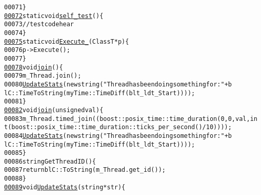 \begin{footnotesize}
\begin{alltt}
00071             \}
\hypertarget{myThreadTemplates_8hpp_source_l00072}{}\hyperlink{classbuskol_1_1ThreadTemplates_1_1thread__1_ac33a5aa33679452b203c539401c92929}{00072}             \textcolor{keyword}{static} \textcolor{keywordtype}{void} \hyperlink{classbuskol_1_1ThreadTemplates_1_1thread__1_ac33a5aa33679452b203c539401c92929}{self_test}()\{
00073                 \textcolor{comment}{//test code hear}
00074             \}
\hypertarget{myThreadTemplates_8hpp_source_l00075}{}\hyperlink{classbuskol_1_1ThreadTemplates_1_1thread__1_a37cde0d5c6105d9194ce1cf981cf9c5a}{00075}             \textcolor{keyword}{static} \textcolor{keywordtype}{void} \hyperlink{classbuskol_1_1ThreadTemplates_1_1thread__1_a37cde0d5c6105d9194ce1cf981cf9c5a}{Execute_}(ClassT *p)\{
00076                 p->Execute();
00077             \}
\hypertarget{myThreadTemplates_8hpp_source_l00078}{}\hyperlink{classbuskol_1_1ThreadTemplates_1_1thread__1_af917523b30feb06614e96371a5c198ed}{00078}             \textcolor{keywordtype}{void} \hyperlink{classbuskol_1_1ThreadTemplates_1_1thread__1_af917523b30feb06614e96371a5c198ed}{join}()\{
00079                 m\_Thread.join();
00080                 \hyperlink{classbuskol_1_1ThreadTemplates_1_1thread__1_ab97928f6c8b8c75b33ffd6e57514d692}{UpdateStats}(\textcolor{keyword}{new} \textcolor{keywordtype}{string}(\textcolor{stringliteral}{"Thread has been doing something for: "}+ b
      lC::TimeToString(myTime::TimeDiff(blt\_ldt\_Start))));
00081             \}
\hypertarget{myThreadTemplates_8hpp_source_l00082}{}\hyperlink{classbuskol_1_1ThreadTemplates_1_1thread__1_a7c62551333aad740fc7b48742cdeb877}{00082}             \textcolor{keywordtype}{void} \hyperlink{classbuskol_1_1ThreadTemplates_1_1thread__1_a7c62551333aad740fc7b48742cdeb877}{join}(\textcolor{keywordtype}{unsigned} val)\{
00083                 m\_Thread.timed\_join(( boost::posix\_time::time\_duration(0,0,val,\textcolor{keywordtype}{in
      t}(boost::posix\_time::time\_duration::ticks\_per\_second() / 10))));
00084                 \hyperlink{classbuskol_1_1ThreadTemplates_1_1thread__1_ab97928f6c8b8c75b33ffd6e57514d692}{UpdateStats}(\textcolor{keyword}{new} \textcolor{keywordtype}{string}(\textcolor{stringliteral}{"Thread has been doing something for: "}+ b
      lC::TimeToString(myTime::TimeDiff(blt\_ldt\_Start))));
00085             \}
00086             \textcolor{keywordtype}{string} GetThreadID()\{
00087                 \textcolor{keywordflow}{return} blC::ToString(m\_Thread.get\_id());
00088             \}
\hypertarget{myThreadTemplates_8hpp_source_l00089}{}\hyperlink{classbuskol_1_1ThreadTemplates_1_1thread__1_ab97928f6c8b8c75b33ffd6e57514d692}{00089}             \textcolor{keywordtype}{void} \hyperlink{classbuskol_1_1ThreadTemplates_1_1thread__1_ab97928f6c8b8c75b33ffd6e57514d692}{UpdateStats}(\textcolor{keywordtype}{string} *str)\{

\end{alltt}
\end{footnotesize}
